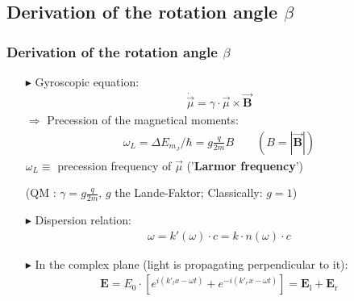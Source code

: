 \documentclass[10pt,a4paper]{beamer}
\begin{document}
\begin{frame}
\subsection{Derivation of the rotation angle $\beta$}
\frametitle{Derivation of the rotation angle $\beta$}
\begin{itemize}
\item[$\blacktriangleright$]
Gyroscopic equation:
\begin{align}
\dot{\vec{\mu}} = \gamma\cdot\vec{\mu}\times\vec{\textbf{B}}
\label{Kreiselgleichung}
\end{align}\pause
$\Rightarrow$ Precession of the magnetical moments:
\begin{align}
\omega_L = \Delta E_{m_J}/ \hbar = g\frac{q}{2m}B \qquad (B = |\vec{\textbf{B}}|)
\label{Larmorfrequenz}
\end{align}\pause
$\omega_L \equiv$ precession frequency of $\vec{\mu}$ ('\textbf{Larmor frequency}')
\newline
\begin{small}(QM : $\gamma = g\frac{q}{2m}$, $g$ the Lande-Faktor;
Classically: $g=1$)
\end{small}\newline\pause
\item[$\blacktriangleright$]
Dispersion relation:
\begin{align}
\omega = k'(\omega)\cdot c = k\cdot n(\omega)\cdot c
\label{Dispersionsrelation}
\end{align}\pause
\item[$\blacktriangleright$]
In the complex plane \small{(light is propagating perpendicular to it)}:
 \begin{align}
\textbf{E} = E_0\cdot[e^{i( k'_l x - \omega t)}+e^{-i( k'_r x - \omega t )}] = \textbf{E}_{\text{l}} + \textbf{E}_{\text{r}}
\label{Lichtwelle_1}
 \end{align}
\end{itemize}
\end{frame}
\end{document}
